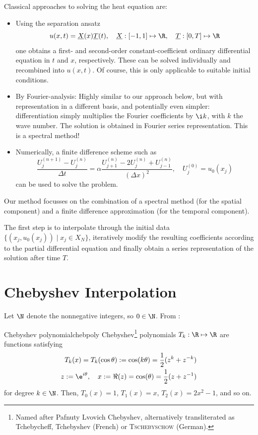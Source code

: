 \documentclass[12pt, a4paper]{article}
\newcommand{\chebyshev}{Chebyshev\xspace}
\begin{document}
  Classical approaches to solving the heat equation are:
  \begin{itemize}
    \item Using the separation ansatz
          $$u(x, t) = \underline{X}(x) \underline{T}(t), \quad \underline{X}: [-1, 1] \mapsto \R, \quad \underline{T}: [0, T] \mapsto \R$$
          one obtains a first- and second-order constant-coefficient ordinary differential equation in $t$ and $x$, respectively. These can be solved individually and recombined into $u(x, t)$. Of course, this is only applicable to suitable initial conditions.

    \item By Fourier-analysis: Highly similar to our approach below, but with representation in a different basis, and potentially even simpler: differentiation simply multiplies the Fourier coefficients by $\i k$, with $k$ the wave number. The solution is obtained in Fourier series representation. This is a spectral method!

    \item Numerically, a finite difference scheme such as
          $$\frac{U_{j}^{(n+1)} - U_{j}^{(n)}}{\Delta t} = \alpha \frac{U_{j+1}^{(n)} - 2 U_{j}^{(n)} + U_{j-1}^{(n)}}{(\Delta x)^2}, \quad U_j^{(0)} = u_0(x_j)$$ can be used to solve the problem.
  \end{itemize}

  Our method focusses on the combination of a spectral method (for the spatial component) and a finite difference approximation (for the temporal component).

  The first step is to interpolate through the initial data $\{(x_j, u_0(x_j)) \;|\; x_j \in X_N\}$, iteratively modify the resulting coefficients according to the partial differential equation and finally obtain a series representation of the solution after time $T$.

  \pagebreak
  \section{Chebyshev Interpolation}
  Let $\N$ denote the nonnegative integers, so $0 \in \N$.
  From \cite{atap}:

  \begin{definition}{Chebyshev polynomial}{chebpoly}
    \chebyshev\footnote{Named after Pafnuty Lvovich \chebyshev, alternatively transliterated as Tchebycheff, Tchebyshev (French) or \textsc{Tschebyschow} (German).} polynomials $T_k: \R \mapsto \R$ are functions satisfying
    \begin{align*}
      T_k(x) = T_k(\cos \theta) := \cos(k \theta) = \frac{1}{2} (z^k + z^{-k}) \\
      z := \e^{i \theta},\quad x := \Re(z) = \cos(\theta) = \frac{1}{2}(z + z^{-1})
    \end{align*}
    for degree $k \in \N$. Then, $T_0(x) = 1$, $T_1(x) = x$, $T_2(x) = 2x^2-1$, and so on.
  \end{definition}
\end{document}
